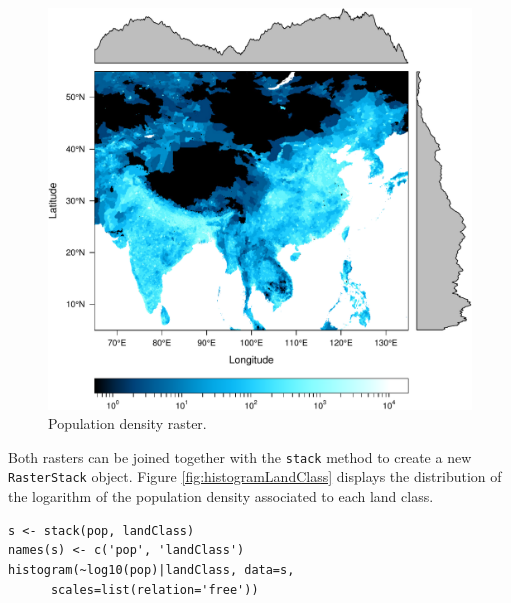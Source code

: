 \begin{figure}[htb]
\centering
\includegraphics[width=.9\linewidth]{figs/populationNASA.pdf}
\caption{\label{fig:populationNASA}Population density raster.}
\end{figure}

Both rasters can be joined together with the \texttt{stack} method to
create a new \texttt{RasterStack} object. Figure
\ref{fig:histogramLandClass} displays the distribution of the
logarithm of the population density associated to each land class.


\lstset{language=R,numbers=none}
\begin{lstlisting}
s <- stack(pop, landClass)
names(s) <- c('pop', 'landClass')
histogram(~log10(pop)|landClass, data=s,
	  scales=list(relation='free'))
\end{lstlisting}


